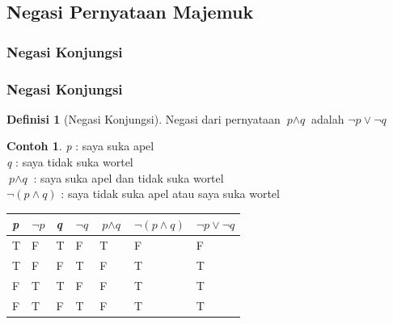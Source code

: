 \documentclass[handout]{beamer}
\theoremstyle{definition}
\newtheorem{definisi}[theorem]{Definisi}
\theoremstyle{example}
\newtheorem{contoh}[theorem]{Contoh}
\begin{document}
\subsection{Negasi Pernyataan Majemuk}
\subsubsection{Negasi Konjungsi}
\begin{frame}
	\frametitle{Negasi Konjungsi}
    	\begin{definisi}[Negasi Konjungsi]
    		Negasi dari pernyataan $\textit{p}\wedge\textit{q}$  adalah $\neg\textit{p}\vee\neg\textit{q}$    		 	
    	\end{definisi}
    	\begin{contoh}
    		\textit{p} : saya suka apel \\
    		\textit{q} : saya tidak suka wortel \\
    		$\textit{p}\wedge\textit{q}$ : saya suka apel dan tidak suka wortel\\
    		$\neg(\textit{p}\wedge\textit{q})$ : saya tidak suka apel atau saya suka wortel	\\
    		
    		\begin{tabular}{ | l | l | l | l | l | l | l |}
    			\hline
    			\textit{p} & $\neg\textit{p}$ & \textit{q} & $\neg\textit{q}$ & $\textit{p}\wedge\textit{q}$ & $\neg(\textit{p}\wedge\textit{q})$ & $\neg\textit{p}\vee\neg\textit{q}$ \\ \hline
    			T & F & T & F & T & F & F\\ \hline
    			T & F & F & T & F & T & T \\ \hline
    			F & T & T & F & F & T & T\\ \hline
    			F & T & F & T & F & T & T\\     		 
    			\hline
    		\end{tabular}
    	\end{contoh}
\end{frame}
\end{document}

